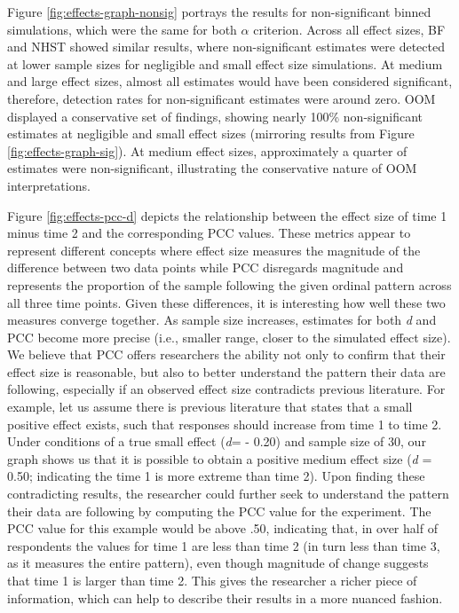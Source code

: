 \documentclass[english,mask,man]{apa6}
\theoremstyle{definition}
\theoremstyle{definition}
\theoremstyle{definition}
\theoremstyle{remark}
\begin{document}
Figure \ref{fig:effects-graph-nonsig} portrays the results for
non-significant binned simulations, which were the same for both
\(\alpha\) criterion. Across all effect sizes, BF and NHST showed
similar results, where non-significant estimates were detected at lower
sample sizes for negligible and small effect size simulations. At medium
and large effect sizes, almost all estimates would have been considered
significant, therefore, detection rates for non-significant estimates
were around zero. OOM displayed a conservative set of findings, showing
nearly 100\% non-significant estimates at negligible and small effect
sizes (mirroring results from Figure \ref{fig:effects-graph-sig}). At
medium effect sizes, approximately a quarter of estimates were
non-significant, illustrating the conservative nature of OOM
interpretations.

Figure \ref{fig:effects-pcc-d} depicts the relationship between the
effect size of time 1 minus time 2 and the corresponding PCC values.
These metrics appear to represent different concepts where effect size
measures the magnitude of the difference between two data points while
PCC disregards magnitude and represents the proportion of the sample
following the given ordinal pattern across all three time points. Given
these differences, it is interesting how well these two measures
converge together. As sample size increases, estimates for both \emph{d}
and PCC become more precise (i.e., smaller range, closer to the
simulated effect size). We believe that PCC offers researchers the
ability not only to confirm that their effect size is reasonable, but
also to better understand the pattern their data are following,
especially if an observed effect size contradicts previous literature.
For example, let us assume there is previous literature that states that
a small positive effect exists, such that responses should increase from
time 1 to time 2. Under conditions of a true small effect (\emph{d}= -
0.20) and sample size of 30, our graph shows us that it is possible to
obtain a positive medium effect size (\emph{d} = 0.50; indicating the
time 1 is more extreme than time 2). Upon finding these contradicting
results, the researcher could further seek to understand the pattern
their data are following by computing the PCC value for the experiment.
The PCC value for this example would be above .50, indicating that, in
over half of respondents the values for time 1 are less than time 2 (in
turn less than time 3, as it measures the entire pattern), even though
magnitude of change suggests that time 1 is larger than time 2. This
gives the researcher a richer piece of information, which can help to
describe their results in a more nuanced fashion.
\end{document}
